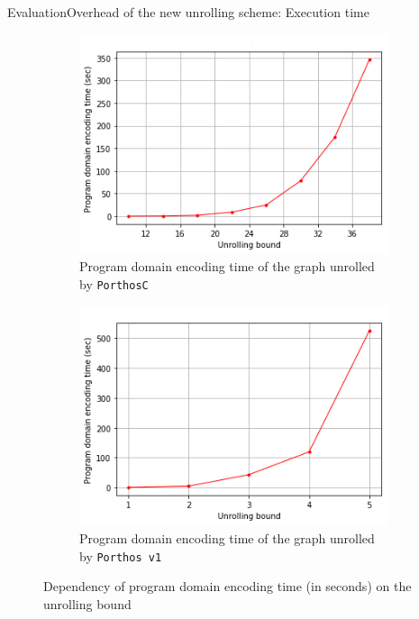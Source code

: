 \documentclass[aspectratio=149]{beamer}
\newcommand{\tool}[1]{\texttt{#1}}
\begin{document}
\begin{frame}{Evaluation}{Overhead of the new unrolling scheme: Execution time}
\begin{figure}[t]
\begin{subfigure}{.45\textwidth}
\includegraphics[width=\textwidth,keepaspectratio]{../img/my/performance/new/new-t.png}
\caption{Program domain encoding time of the graph unrolled by \tool{PorthosC}}
\label{dep:time:new}
\end{subfigure}
\hfill
%
\begin{subfigure}{.45\textwidth}
\includegraphics[width=\textwidth,keepaspectratio]{../img/my/performance/new/old-t.png}
\caption{Program domain encoding time of the graph unrolled by \tool{Porthos\,v1}}
\label{dep:time:old}
\end{subfigure}
%
\caption{Dependency of program domain encoding time (in seconds) on the unrolling bound}
\label{dep:time}
\end{figure}
\end{frame}
\end{document}
